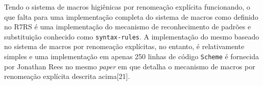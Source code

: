 Tendo o sistema de macros higiênicas por renomeação explícita funcionando, o que falta
para uma implementação completa do sistema de macros como definido no \acs{R7RS}
é uma implementação do mecanismo de reconhecimento de padrões e substituição
conhecido como \texttt{syntax-rules}. A implementação do mesmo baseado no
sistema de macros por renomeação explícitas, no entanto, é relativamente simples
e uma implementação em apenas 250 linhas de código \texttt{Scheme} é fornecida
por Jonathan Rees no mesmo \textit{paper} em que detalha o mecanismo de macros
por renomeação explícita descrita acima[21].
